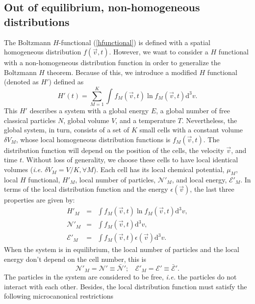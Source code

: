 \documentclass{article}
\begin{document}
\subsection{Out of equilibrium, non-homogeneous distributions}
The Boltzmann $H$-functional (\ref{hfunctional}) is defined with a spatial homogeneous distribution $f(\vec{v},t)$. However, we want to consider a $H$ functional with a non-homogeneous distribution function in order to generalize the Boltzmann $H$ theorem. Because of this, we introduce a modified $H$ functional (denoted as $H'$) defined as
\begin{equation}
   H'(t)=\sum_{M=1}^{K}\int_{}^{} f_M(\vec{v},t) \ln f_M(\vec{v},t)\mathrm{d}^3v  \label{CH2}.
\end{equation}
This $H'$ describes a system with a global energy $E$, a global number of free
classical particles $N$, global volume $V$, and a temperature $T$. Nevertheless, the global system, in turn, consists of a set of $K$ small cells with a constant volume $\delta V_M$, whose local homogeneous distribution functions is $f_{M}(\vec{v},t)$. The distribution function will depend on the position of the cells, the velocity $\vec{v}$, and time $t$. Without loss of generality, we choose these cells to have
local identical volumes (\textit{i.e.} $\delta V_M = V/K, \forall M$). Each cell has its local chemical potential, $\mu_M$, local
$H$ functional, $H'_M$, local number of particles, $\mathcal{N}'_M$, and local energy, $\mathcal{E}'_M$. In terms of the local distribution 
function and the energy $\epsilon(\vec{v})$, the last three properties are given by:
\begin{eqnarray}
    H'_M &=&  \int f_M(\vec{v},t) \ln f_{M}(\vec{v},t) \mathrm{d}^{3}v \label{Hcell},\\
    {\mathcal{N}}'_M&=& \int f_{M}(\vec{v} ,t) \mathrm{d}^{3}v, \nonumber \\
{\mathcal{E}}'_M&=& \int f_{M}(\vec{v},t)\epsilon(\vec{v}) \mathrm{d}^{3}v.
\end{eqnarray}
When the system is in equilibrium, the local number of particles and the local energy don't depend on the cell number, this is
\begin{equation}
   {\mathcal{N}}'_M=\mathcal{N}'\equiv \bar{\mathcal{N}}'; \ \ \ \  {\mathcal{E}}'_M=\mathcal{E}'\equiv \bar{\mathcal{E}}'.
\end{equation}
The particles in the system are considered to be free, \textit{i.e.} the particles do not interact with each other. Besides, the local distribution function must satisfy the following microcanonical restrictions 
\end{document}
